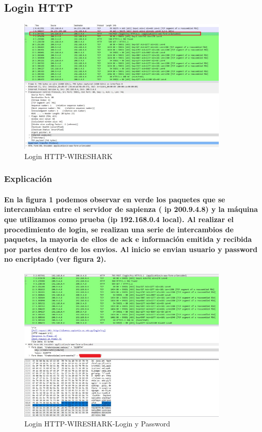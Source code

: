 \documentclass[letterpaper]{article}
\begin{document}
\newpage
\subsection{Login HTTP}
	\begin{figure}[h]
			\centering
			\includegraphics[width=0.9\textwidth]{img/http-login-1.jpg}
			\caption{Login HTTP-WIRESHARK}
			\label{figura 1}
		\end{figure}



\subsubsection{Explicación}
\paragraph{En la figura 1 podemos observar en verde los paquetes que se intercambian entre el servidor de sapienza ( ip 200.9.4.8) y la máquina que utilizamos como prueba (ip 192.168.0.4 local). Al realizar el procedimiento de login, se realizan una serie de intercambios de paquetes, la mayoria de ellos de ack e información emitida y recibida por partes dentro de los envios. Al inicio se envian usuario y password no encriptado (ver figura 2).}

\begin{figure}[h]
	\centering
	\includegraphics[width=0.9\textwidth]{img/http-login-5.jpg}
	\caption{Login HTTP-WIRESHARK-Login y Password}
	\label{figura 2}
\end{figure}
\end{document}
